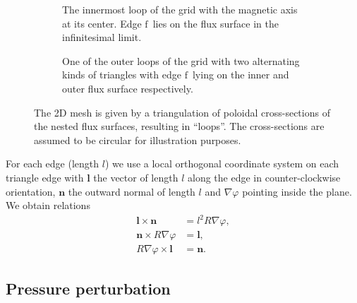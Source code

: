 \documentclass[a4paper, 10pt, english]{article}
\let\temp\varrho
\let\varrho\rho
\let\rho\temp
\let\temp\vartheta
\let\vartheta\theta
\let\theta\temp
\let\temp\varphi
\let\varphi\phi
\let\phi\temp
\let\vec\symbf
\newcommand*\fs{\ensuremath{\textrm{f}}}  %
\begin{document}
\begin{figure}
  \centering
  \begin{subfigure}[b]{0.33\textwidth}
    \centering
    
    \caption{The innermost loop of the grid with the magnetic axis at its center. Edge \fs\ lies on the flux surface in the infinitesimal limit.}
    \label{fig:grid0}
  \end{subfigure}
  \quad
  \begin{subfigure}[b]{0.5\textwidth}
    \centering
    
    \caption{One of the outer loops of the grid with two alternating kinds of triangles with edge \fs\ lying on the inner and outer flux surface respectively.}
    \label{fig:grid1}
  \end{subfigure}
  \caption{The 2D mesh is given by a triangulation of poloidal cross-sections of the nested flux surfaces, resulting in \enquote{loops}. The cross-sections are assumed to be circular for illustration purposes.}
  \label{fig:grid}
\end{figure}

For each edge (length $l$) we use a local orthogonal coordinate system on each triangle edge with $\vec{l}$ the vector of length $l$ along the edge in counter-clockwise orientation, $\vec{n}$ the outward normal of length $l$ and $\nabla \phi$ pointing inside the plane. We obtain relations
\begin{align}
  \vec{l} \times \vec{n} &= l^{2} R \nabla \phi, \\
  \vec{n} \times R \nabla \phi &= \vec{l}, \\
  R \nabla \phi \times \vec{l} &= \vec{n}.
\end{align}

\subsection{Pressure perturbation}
\end{document}
